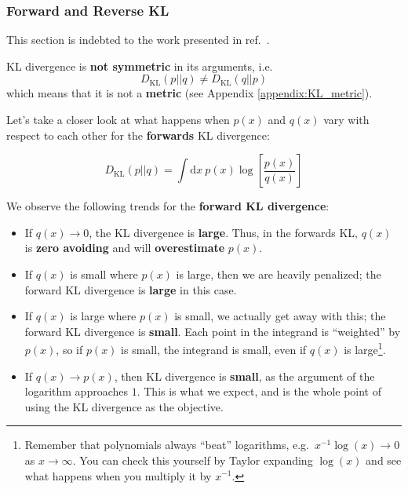 \documentclass[]{article}
\begin{document}
\subsubsection{Forward and Reverse KL} \label{section:f_and_r_kl}
This section is indebted to the work presented in ref.~\cite{Ganguly2021}.

KL divergence is \textbf{not symmetric} in its arguments, i.e.\ 
\begin{equation}\label{eq:forwards_KL_neq_backwards_KL}
    D_\text{KL}(p||q) \ne D_\text{KL}(q||p)
\end{equation}
which means that it is not a \textbf{metric} (see Appendix \ref{appendix:KL_metric}). 

Let's take a closer look at what happens when $p(x)$ and $q(x)$ vary with respect to each other for the \textbf{forwards} KL divergence:

\begin{equation}\label{eq:forwards_kl}
    D_\text{KL}(p||q) = \int \text{d}x~ p(x)\log\left[\frac{p(x)}{q(x)}\right]
\end{equation}

We observe the following trends for the \textbf{forward KL divergence}:

\begin{itemize}
    \item If $q(x)\rightarrow 0$, the KL divergence is \textbf{large}. Thus, in the forwards KL, $q(x)$ is \textbf{zero avoiding} and will \textbf{overestimate} $p(x)$.
    \item If $q(x)$ is small where $p(x)$ is large, then we are heavily penalized; the forward KL divergence is \textbf{large} in this case.
    \item If $q(x)$ is large where $p(x)$ is small, we actually get away with this; the forward KL divergence is \textbf{small}. Each point in the integrand is ``weighted'' by $p(x)$, so if $p(x)$ is small, the integrand is small, even if $q(x)$ is large\footnote{Remember that polynomials always ``beat'' logarithms, e.g.\ $x^{-1} \log(x)\rightarrow 0$ as $x\rightarrow \infty$. You can check this yourself by Taylor expanding $\log(x)$ and see what happens when you multiply it by $x^{-1}$.}.
    \item If $q(x) \rightarrow p(x)$, then KL divergence is \textbf{small}, as the argument of the logarithm approaches $1$. This is what we expect, and is the whole point of using the KL divergence as the objective.
\end{itemize}
\end{document}
